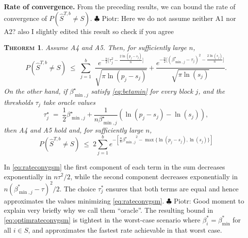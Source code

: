 \documentclass[aos]{imsart}
\theoremstyle{plain}
\newtheorem{thm}{\textsc{Theorem}}[section]
\newcommand{\piotr}[1]{{\small{\color{red} \sf $\clubsuit$ Piotr: #1}}}
\newcommand{\bs}{\boldsymbol}
\begin{document}
\noindent\textbf{Rate of convergence.} From the %
preceding results, we can bound the rate of convergence of $P(\hat S^{T, b}\neq S)$.\piotr{Here we do not assume neither A1 nor A2? also I slightly edited this result so check if you agree} %
\begin{thm}\label{theo:fullrecovGS}
Assume A4 and A5. Then, for sufficiently large $n$,
\begin{equation} \label{eq:rateconvgsm}
P(\hat{S}^{T,b} \neq S)\;\leq\;\sum_{j=1}^b\,\,\frac{e^{-\tfrac{n}{2}\big[\tau_j^2-\tfrac{2\ln(p_j-s_j)}{n}\big]}}{\sqrt{\pi\ln(p_j-s_j)}}+\frac{e^{-\tfrac{n}{2}\big[(\beta^\star_{\min,j}-\tau_j)^2-\tfrac{2\ln(s_j)}{n}\big]}}{\sqrt{\pi\ln(s_j)}}.
\end{equation}
On the other hand, if $\beta^\star_{\min,j}$ satisfy \eqref{eq:betamin} for every block $j$, and the thresholds $\tau_j$ take oracle values
	\begin{equation} \label{eq:optimtauj}
\tau^\star_j \;=\; \frac{1}{2}\beta^\star_{\min,j}+\frac{1}{n\beta^\star_{\min,j}}(\ln({p_j-s_j})-\ln({s_j})),
\end{equation}
then A4 and A5 hold and, for sufficiently large $n$, %
\begin{equation}\label{eq:optimrateconvgsm}
    P(\hat{S}^{T,b} \neq S) \; \leq \; 2 \sum_{j=1}^be^{-[\frac{n}{8}{\beta^\star_{\min,j}}^2-\max\{\ln(p_j-s_j),\ln(s_j)\}]}
\end{equation}
\end{thm}
In \eqref{eq:rateconvgsm} the first component of each term in the sum decreases exponentially in $n\tau^2/2$, while the second component decreases exponentially in $n(\beta_{\min,j}^*-\tau)^2/2$. The choice $\tau^*_j$ ensures that both terms are equal and hence approximates the values minimizing \eqref{eq:rateconvgsm}.  \piotr{Good moment to explain very briefly why we call them ``oracle''.} 
The resulting bound in \eqref{eq:optimrateconvgsm} is tightest in the worst-case scenario where $\beta_i^*=\beta_{\min}^*$ for all $i \in S$, and approximates the fastest rate achievable in that worst case.
\end{document}
